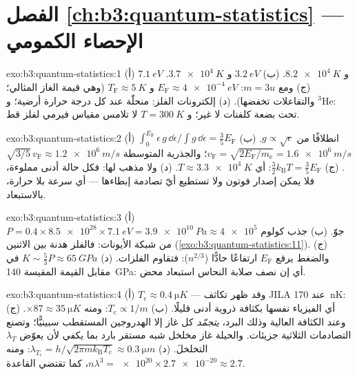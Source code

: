 \section*{الفصل \ref{ch:b3:quantum-statistics} --- الإحصاء الكمومي}

\begin{solution}{exo:b3:quantum-statistics:1}
(أ) $\qty{7.1}{eV}$ و $\qty{8.2e4}{K}$. (ب) $\qty{3.2}{eV}$ و
$\qty{3.7e4}{K}$. (ج) ومع $m = 3u$: $E_{\text{F}} \approx
\qty{4e-4}{eV}$ و $T_{\text{F}} \approx \qty{5}{K}$ (وهي قيمة
الغاز المثالي؛ والتفاعلات تخفضها). (د) إلكترونات الفلز: منحلّة عند
كل درجة حرارة أرضية؛ و $^3$He: تحت بضعة كلفنات لا غير؛ و
$T = \qty{300}{K}$ لا تلامس مقياس فيرمي لفلز قط.
\end{solution}

\begin{solution}{exo:b3:quantum-statistics:2}
(أ) $\int_0^{E_{\text{F}}}\epsilon\,g\,\dd\epsilon/\int g\,\dd
\epsilon = \tfrac35 E_{\text{F}}$ انطلاقًا من $g \propto \sqrt\epsilon$.
(ب) $v_{\text{F}} = \sqrt{2E_{\text{F}}/m_{\text{e}}} =
\qty{1.6e6}{m/s}$؛ والجذرية المتوسطة $\sqrt{3/5}\,v_{\text{F}} \approx
\qty{1.2e6}{m/s}$. (ج) $\tfrac32 k_{\text{B}}T = \tfrac35
E_{\text{F}}$: أي $T \approx \qty{3.3e4}{K}$. (د) ولا مذهب
لها: فكل حالة أدنى مملوءة، فلا يمكن إصدار فوتون ولا
تستطيع أيّ تصادمة إبطاءها --- أي سرعة بلا حرارة، بالاستبعاد.
\end{solution}

\begin{solution}{exo:b3:quantum-statistics:3}
(أ) $P = 0.4 \times \num{8.5e28} \times \qty{7.1}{eV} =
\qty{3.9e10}{Pa} \approx \num{4e5}$ جوّ. (ب) جذب كولوم
من شبكة الأيونات: فالفلز هدنة بين
الاثنين (\cref{exo:b3:quantum-statistics:11}). (ج) والضغط يرفع
$E_{\text{F}}$ ارتفاعًا حادًّا ($n^{2/3}$): فتقاوم الفلزات. (د) $K \sim
\tfrac53 P \approx \qty{65}{GPa}$ في مقابل القيمة المقيسة
\qty{140}{GPa}: أي إن نصف صلابة النحاس استبعاد محض.
\end{solution}

\begin{solution}{exo:b3:quantum-statistics:4}
(أ) $T_{\text{c}} \approx \qty{0.4}{\micro K}$ --- وقد ظهر تكاثف
JILA عند \qty{170}{nK}: أي الفيزياء نفسها بكثافة ذروية
أدنى قليلًا. (ب) $T_{\text{c}} \propto 1/m$: ومنه $\times87 \approx
\qty{35}{\micro K}$. (ج) وعند الكثافة العالية وذلك البرد، \emph{يتجمّد}
كل غاز إلا الهدروجين المستقطب سبينيًّا؛ وتصنع التصادمات
الثلاثية جزيئات. والحيلة غاز مخلخل شبه مستقر
بارد بما يكفي لأن يعوّض $\lambda_T$ التخلخلَ. (د)
$\lambda_{T_{\text{c}}} = h/\sqrt{2\pi mk_{\text{B}}T_{\text{c}}}
\approx \qty{0.3}{\micro m}$: ومنه $n\lambda^3 = \num{e20} \times
\num{2.7e-20} \approx 2.7$، كما تقتضي القاعدة.
\end{solution}

